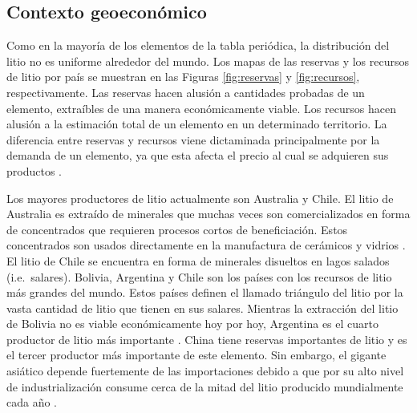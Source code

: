 \clearpage
\subsection{Contexto geoeconómico}
Como en la mayoría de los elementos de la tabla periódica, la distribución del litio no es uniforme alrededor del mundo. Los mapas de las reservas y los recursos de litio por país se muestran en las Figuras \ref{fig:reservas} y \ref{fig:recursos}, respectivamente. Las reservas hacen alusión a cantidades probadas de un elemento, extraíbles de una manera económicamente viable. Los recursos hacen alusión a la estimación total de un elemento en un determinado territorio. La diferencia entre reservas y recursos viene dictaminada principalmente por la demanda de un elemento, ya que esta afecta el precio al cual se adquieren sus productos \citep{VIKSTROM2013}. 

Los mayores productores de litio actualmente son Australia y Chile. El litio de Australia es extraído de minerales que muchas veces son comercializados en forma de concentrados que requieren procesos cortos de beneficiación. Estos concentrados son usados directamente en la manufactura de cerámicos y vidrios \citep{Bradley2017}. El litio de Chile se encuentra en forma de minerales disueltos en lagos salados (i.e.\ salares).  Bolivia, Argentina y Chile son los países con los recursos de litio más grandes del mundo. Estos países definen el llamado {triángulo del litio} por la vasta cantidad de litio que tienen en sus salares. Mientras la extracción del litio de Bolivia no es viable económicamente hoy por hoy, Argentina es el cuarto productor de litio más importante \citep{USGS2020}. China tiene reservas importantes de litio y es el tercer productor más importante de este elemento. Sin embargo, el gigante asiático depende fuertemente de las importaciones debido a que por su alto nivel de industrialización consume cerca de la mitad del litio producido mundialmente cada año \citep{Olivetti2017}. 

